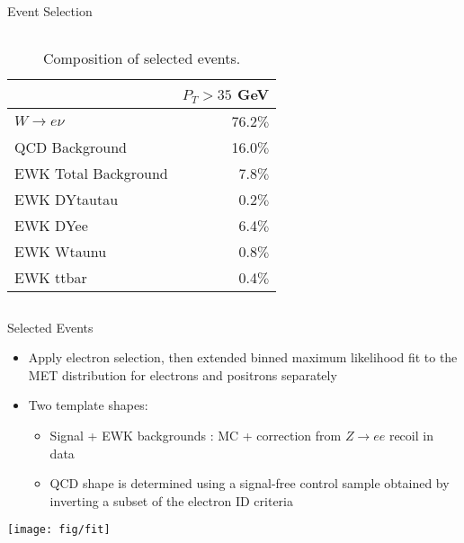 \documentclass[t, 8pt]{beamer}
\begin{document}
\begin{frame}{Event Selection}
\begin{columns}[c]
{\begin{center}
    \begin{table}[htbp]
    \begin{tabular}{|l|r|}
    \hline
    & $P_{T}>35$ GeV \\ \hline
    $W\to e\nu$  & 76.2$\%$\\\hline
    QCD Background       & 16.0$\%$\\\hline
    EWK Total Background & 7.8$\%$ \\
    EWK DYtautau         & 0.2$\%$  \\
    EWK DYee             & 6.4$\%$  \\
    EWK Wtaunu           & 0.8$\%$ \\
    EWK ttbar            & 0.4$\%$ \\\hline
    \end{tabular}
    \caption{\label{tab:composition} Composition of selected events.}%
    \end{table}
  \end{center}
  }

  \end{columns}
\end{frame}

\begin{frame}{Selected Events}
  \begin{itemize}
    \item Apply electron selection, then extended binned maximum likelihood fit to the MET distribution for electrons and positrons separately
    \item Two template shapes:
    \begin{itemize}
      \item Signal + EWK backgrounds : MC + correction from $Z \to ee$ recoil in data 
      \item QCD shape is determined using a signal-free control sample obtained by inverting a subset of the electron ID criteria
    \end{itemize}
  \end{itemize}
    \begin{center}
      \texttt{[image: fig/fit]}
    \end{center}
\end{frame}
\end{document}
